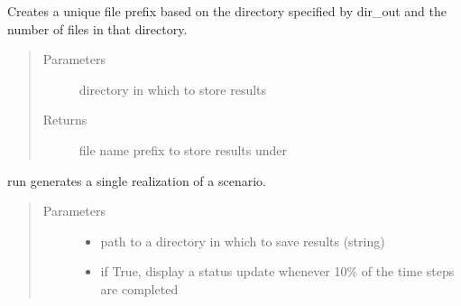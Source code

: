 \documentclass[letterpaper,10pt,english]{sphinxmanual}
\begin{document}
\begin{fulllineitems}
\begin{fulllineitems}
\begin{quote}
\begin{description}
\end{description}\end{quote}

\end{fulllineitems}


\begin{fulllineitems}
\label{\detokenize{index:feast.EmissionSimModules.simulation_classes.Scenario.real_filename}}
Creates a unique file prefix based on the directory specified by dir\_out and the number of files in that
directory.
\begin{quote}\begin{description}
\item[{Parameters}] \leavevmode
{} \textendash{} directory in which to store results

\item[{Returns}] \leavevmode
file name prefix to store results under

\end{description}\end{quote}

\end{fulllineitems}


\begin{fulllineitems}
\label{\detokenize{index:feast.EmissionSimModules.simulation_classes.Scenario.run}}
run generates a single realization of a scenario.
\begin{quote}\begin{description}
\item[{Parameters}] \leavevmode\begin{itemize}
\item {} 
 \textendash{} path to a directory in which to save results (string)

\item {} 
 \textendash{} if True, display a status update whenever 10\% of the time steps are completed


\end{itemize}
\end{description}
\end{quote}
\end{fulllineitems}
\end{fulllineitems}
\end{document}
